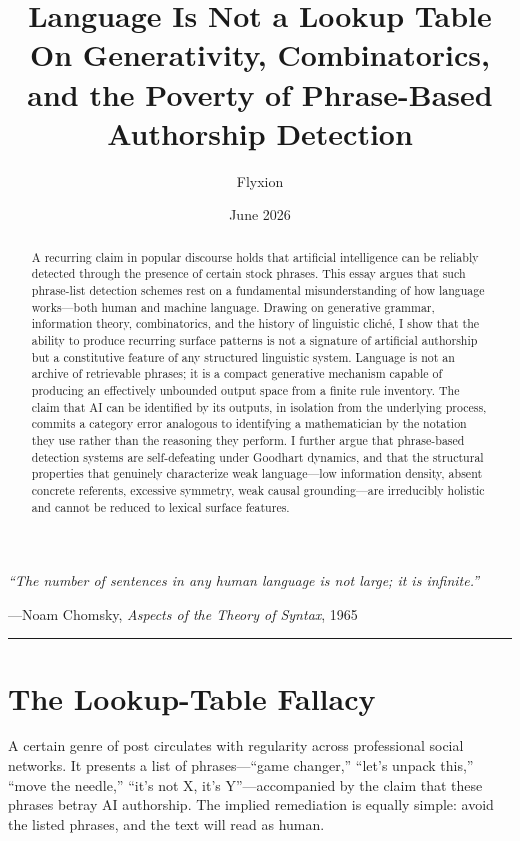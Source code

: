\documentclass[12pt]{article}
\title{\textbf{Language Is Not a Lookup Table} \\[0.5em]
\large On Generativity, Combinatorics, and the Poverty of Phrase-Based Authorship Detection}
\author{Flyxion}
\date{June 2026}
\begin{document}
\maketitle

\epigraph{\textit{``The number of sentences in any human language is not large; it is infinite.''}}%
{---Noam Chomsky, \textit{Aspects of the Theory of Syntax}, 1965}

\vspace{1em}

\begin{abstract}
\noindent
A recurring claim in popular discourse holds that artificial intelligence can be reliably detected through the presence of certain stock phrases. This essay argues that such phrase-list detection schemes rest on a fundamental misunderstanding of how language works---both human and machine language. Drawing on generative grammar, information theory, combinatorics, and the history of linguistic clich\'e, I show that the ability to produce recurring surface patterns is not a signature of artificial authorship but a constitutive feature of any structured linguistic system. Language is not an archive of retrievable phrases; it is a compact generative mechanism capable of producing an effectively unbounded output space from a finite rule inventory. The claim that AI can be identified by its outputs, in isolation from the underlying process, commits a category error analogous to identifying a mathematician by the notation they use rather than the reasoning they perform. I further argue that phrase-based detection systems are self-defeating under Goodhart dynamics, and that the structural properties that genuinely characterize weak language---low information density, absent concrete referents, excessive symmetry, weak causal grounding---are irreducibly holistic and cannot be reduced to lexical surface features.
\end{abstract}

\vspace{1em}
\hrule
\vspace{1em}

\section{The Lookup-Table Fallacy}

A certain genre of post circulates with regularity across professional social networks. It presents a list of phrases---``game changer,'' ``let's unpack this,'' ``move the needle,'' ``it's not X, it's Y''---accompanied by the claim that these phrases betray AI authorship. The implied remediation is equally simple: avoid the listed phrases, and the text will read as human.
\end{document}
